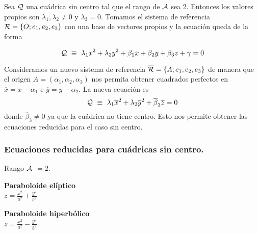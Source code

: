 \documentclass[11pt, a4paper]{article}
\newif\IfInSansMode
\let\oldsf\sffamily
\renewcommand*{\sffamily}{\oldsf\mathversion{sans}\InSansModetrue}
\theoremstyle{theorem-style}
\theoremstyle{definition-style}
\theoremstyle{remark-style}
\theoremstyle{example-style}
\begin{document}
Sea $\cal Q$ una cu\'adrica sin centro tal que el rango de $\cal A$ sea $2$. Entonces los valores propios son 
$\lambda_1,\lambda_2 \neq 0$ y $\lambda_3=0$. Tomamos el sistema de referencia ${\cal R} = \{O; e_1,e_2,e_3\}$ con una base de vectores propios y la ecuaci\'on queda de la forma 

\vspace{.3cm}

\[
{\cal Q} \, \, \equiv \, \, \lambda_1 x^2 + \lambda_2 y^2 + \beta_1 x + \beta_2 y + \beta_3 z + \gamma = 0
\]  

\vspace{.2cm}

Consideramos un nuevo sistema de referencia $\overline{{\cal R}} = \{A;e_1,e_2,e_3\}$ de manera que el origen 
$A=(\alpha_1,\alpha_2,\alpha_3)$ nos permita obtener cuadrados perfectos en $\overline{x}=x-\alpha_1$ e 
$\overline{y}=y-\alpha_2$. La nueva ecuaci\'on es
\[
{\cal Q} \, \, \equiv \, \, \lambda_1 \overline{x}^2 + \lambda_2 \overline{y}^2 + 
\overline{\beta}_3 \overline{z} = 0
\]
donde $\overline{\beta}_3\neq 0$ ya que la cu\'adrica no tiene centro. Esto nos permite obtener las ecuaciones reducidas para el caso sin centro.


\subsubsection{Ecuaciones reducidas para cuádricas sin centro.}

Rango $\cal A$ $=2$.

\begin{minipage}[c]{0.45\textwidth}
  {\bf Paraboloide elíptico}\vspace{1em}\\
  $\displaystyle z = \frac{x^2}{a^2} + \frac{y^2}{b^2}$
\end{minipage}\hfill
\begin{minipage}[]{0.45\textwidth}
\end{minipage}

\begin{minipage}[c]{0.45\textwidth}
  {\bf Paraboloide hiperbólico}\vspace{1em}\\
  $\displaystyle z = \frac{x^2}{a^2} - \frac{y^2}{b^2}$
\end{minipage}\hfill
\begin{minipage}[]{0.45\textwidth}
\end{minipage}
\end{document}
